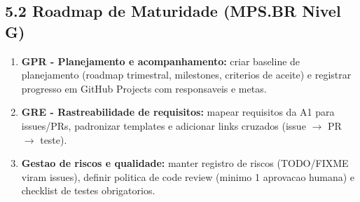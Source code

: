 \documentclass[12pt]{article}
\begin{document}
\subsection*{5.2 Roadmap de Maturidade (MPS.BR Nivel G)}
\begin{enumerate}[label=\textbf{Acao \arabic*:}]
  \item \textbf{GPR - Planejamento e acompanhamento:} criar baseline de planejamento (roadmap trimestral, milestones, criterios de aceite) e registrar progresso em GitHub Projects com responsaveis e metas.
  \item \textbf{GRE - Rastreabilidade de requisitos:} mapear requisitos da A1 para issues/PRs, padronizar templates e adicionar links cruzados (issue $\rightarrow$ PR $\rightarrow$ teste).
  \item \textbf{Gestao de riscos e qualidade:} manter registro de riscos (TODO/FIXME viram issues), definir politica de code review (minimo 1 aprovacao humana) e checklist de testes obrigatorios.
\end{enumerate}
\end{document}
